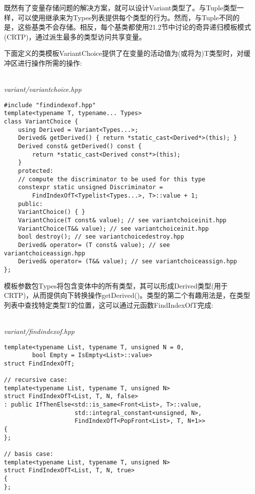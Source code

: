 
既然有了变量存储问题的解决方案，就可以设计Variant类型了。与Tuple类型一样，可以使用继承来为Types列表提供每个类型的行为。然而，与Tuple不同的是，这些基类不会存储。相反，每个基类都使用21.2节中讨论的奇异递归模板模式(CRTP)，通过派生最多的类型访问共享变量。

下面定义的类模板VariantChoice提供了在变量的活动值为(或将为)T类型时，对缓冲区进行操作所需的操作:

\hspace*{\fill} \\ %
\noindent
\textit{variant/variantchoice.hpp}
\begin{lstlisting}[style=styleCXX]
#include "findindexof.hpp"
template<typename T, typename... Types>
class VariantChoice {
	using Derived = Variant<Types...>;
	Derived& getDerived() { return *static_cast<Derived*>(this); }
	Derived const& getDerived() const {
		return *static_cast<Derived const*>(this);
	}
	protected:
	// compute the discriminator to be used for this type
	constexpr static unsigned Discriminator =
		FindIndexOfT<Typelist<Types...>, T>::value + 1;
	public:
	VariantChoice() { }
	VariantChoice(T const& value); // see variantchoiceinit.hpp
	VariantChoice(T&& value); // see variantchoiceinit.hpp
	bool destroy(); // see variantchoicedestroy.hpp
	Derived& operator= (T const& value); // see variantchoiceassign.hpp
	Derived& operator= (T&& value); // see variantchoiceassign.hpp
};
\end{lstlisting}

模板参数包Types将包含变体中的所有类型，其可以形成Derived类型(用于CRTP)，从而提供向下转换操作getDerived()。类型的第二个有趣用法是，在类型列表中查找特定类型T的位置，这可以通过元函数FindIndexOfT完成:

\hspace*{\fill} \\ %
\noindent
\textit{variant/findindexof.hpp}
\begin{lstlisting}[style=styleCXX]
template<typename List, typename T, unsigned N = 0,
		bool Empty = IsEmpty<List>::value>
struct FindIndexOfT;

// recursive case:
template<typename List, typename T, unsigned N>
struct FindIndexOfT<List, T, N, false>
: public IfThenElse<std::is_same<Front<List>, T>::value,
					std::integral_constant<unsigned, N>,
					FindIndexOfT<PopFront<List>, T, N+1>>
{
};

// basis case:
template<typename List, typename T, unsigned N>
struct FindIndexOfT<List, T, N, true>
{
};
\end{lstlisting}

